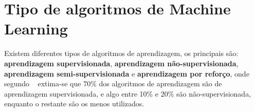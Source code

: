\section{Tipo de algoritmos de Machine Learning}
\label{sec:ml-types}

Existem diferentes tipos de algoritmos de aprendizagem, os principais são: \textbf{aprendizagem supervisionada}, \textbf{aprendizagem não-supervisionada},
\textbf{aprendizagem semi-supervisionada} e \textbf{aprendizagem por reforço}, onde segundo ~\cite{uso_ml} extima-se que 70\% dos algoritmos de aprendizagem são de 
aprendizagem supervisionada, e algo entre 10\% e 20\% são não-supervisionada, enquanto o restante são os menos utilizados.



